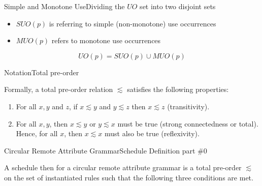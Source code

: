 \begin{frame}{Simple and Monotone Use}{Dividing the $\mathit{UO}$ set into two disjoint sets}

\begin{itemize}
    \item $\mathit{SUO}(p)$ is referring to \alert{simple} (non-monotone) use occurrences  
    \item $\mathit{MUO}(p)$ refers to \alert{monotone} use occurrences
\end{itemize}

\newlinevspace

    \[ \mathit{UO}(p) = \mathit{SUO}(p) \cup \mathit{MUO}(p) \]

\end{frame}

\begin{frame}{Notation}{Total pre-order}

Formally, a total pre-order relation $\lesssim$ satisfies the following properties:

\begin{enumerate}
    \item For all $x,y$ and $z$, if $x\lesssim y$ and $y\lesssim z$ then $x\lesssim z$ (\alert{transitivity}).
    \item For all $x, y$, then $x\lesssim y$ or $y\lesssim x$ must be true (strong connectedness or \alert{total}). Hence, for all $x$, then $x\lesssim x$ must also be true (\alert{reflexivity}).
\end{enumerate}    

\end{frame}

\begin{frame}{Circular Remote Attribute Grammar}{Schedule Definition part \#0}
    
    \begin{definition}
A schedule then for a circular remote attribute grammar is a \alert{total pre-order} $\lesssim$ on the \alert{set of instantiated rules} such that the following \alert{three conditions} are met.
\end{definition}
    
\end{frame}

